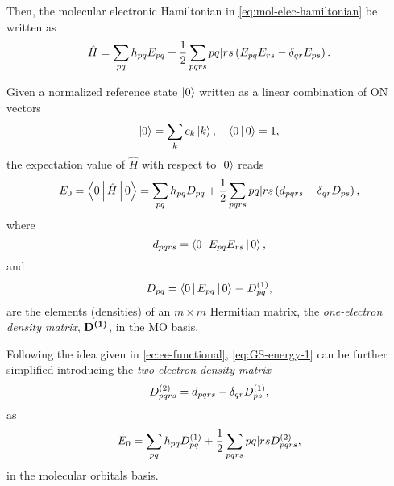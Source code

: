 Then, the molecular electronic Hamiltonian in \cref{eq:mol-elec-hamiltonian} be written as 
\begin{equation}
    \hat{H} =
    \sum_{pq} h_{pq} E_{pq}
    + \frac{1}{2}
    \sum_{pqrs} \PBraket{pq | rs} \left( E_{pq} E_{rs} - \delta_{qr}E_{ps} \right)
    .
\end{equation}

Given a normalized reference state
$\Ket{0}$ written as a linear combination of ON vectors 
\begin{equation}
    \Ket{0} = \sum_{k} c_k \Ket{k}
    , \quad
    \Braket{0 | 0} = 1
    ,
\end{equation}
the expectation value of $\hat{H}$ with respect to $\Ket{0}$ reads
\begin{equation} \label{eq:GS-energy-1}
    E_0 = \Braket{0 | \hat{H} | 0} =
    \sum_{pq} h_{pq} D_{pq} + \frac{1}{2} \sum_{pqrs}
    \PBraket{pq | rs} \left( d_{pqrs} - \delta_{qr} D_{ps} \right)
    ,
\end{equation}
where 
\begin{equation}
    d_{pqrs} = \Braket{0 | E_{pq} E_{rs} | 0}
    ,
\end{equation}
and
\begin{equation} \label{eq:oedm-spin-representation}
    D_{pq} = \Braket{0 | E_{pq} | 0} \equiv \oedm_{pq}
    ,
\end{equation}
are the elements (densities) of an $m \times m$ Hermitian matrix, the
\textit{one-electron density matrix}, $ \mat{\oedm}$, in the MO basis.

Following the idea given in \cref{ec:ee-functional}, \cref{eq:GS-energy-1}
can be further simplified introducing the \textit{two-electron density matrix}
\begin{equation} \label{eq:tedm-spin-representation}
    \tedm_{pqrs} = d_{pqrs} - \delta_{qr} \oedm_{ps}
    ,
\end{equation}
as
\begin{equation} \label{eq:GS-energy-2}
    E_0 =
    \sum_{pq} h_{pq} \oedm_{pq} + \frac{1}{2} \sum_{pqrs}
    \PBraket{pq | rs} \tedm_{pqrs}
    ,
\end{equation}
in the molecular orbitals basis.

